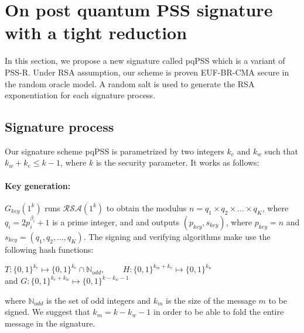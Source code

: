 \documentclass[a4paper,11pt]{article}
\begin{document}
\section{On post quantum PSS signature with a tight reduction}\label{sec:two}

In this section,  we propose a new signature called pqPSS which is a variant of PSS-R. Under RSA
assumption, our scheme is proven EUF-BR-CMA secure in the random oracle model. A random salt is used to generate the RSA exponentiation for each signature process.

\subsection{Signature process}\label{sec:two:1}
Our signature scheme pqPSS is parametrized by two integers $k_e$ and $k_w$ such that $k_w+k_e \leq k-1$, where $k$ is the security parameter. It works as follows:
 \vspace{0.2cm}

\paragraph{Key generation:}  $G_{key}(1^{k})$ runs $\mathcal{R}\mathcal{S}\mathcal{A}(1^k)$ to obtain the modulus $n=q_1\times q_2\times ...\times q_K$, where $q_i=2p_i^{\beta _i}+1$ is a prime integer, and  and outputs $(p_{key},s_{key})$, where $p_{key}=n$ and $s_{key}=(q_1,q_2,...,q_K)$. The signing and verifying algorithms make use the following hash functions:\\
\begin{center}
$T:\{0,1\}^{k_r}\stackrel{}{\longmapsto}\{0,1\}^{k_e}\cap \mathbb{N}_{odd}$, \ \ \ \ $H:\{0,1\}^{k_m+k_e}\stackrel{}{\longmapsto}\{0,1\}^{k_w}$ \\ and $G:\{0,1\}^{k_e+k_w}\stackrel{}{\longmapsto}\{0,1\}^{k-k_w-1}$
\end{center}
where $\mathbb{N}_{odd}$ is the set of odd integers and $k_m$ is the size of the message $m$ to be signed. We suggest that $k_m=k-k_w-1$ in order to be able to fold the entire message in the signature.

\end{document}
